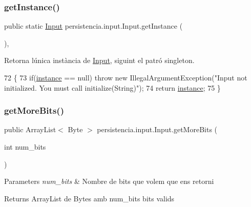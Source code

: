 \subsubsection{\texorpdfstring{get\+Instance()}{getInstance()}}
{\footnotesize\ttfamily public static \hyperlink{classpersistencia_1_1input_1_1Input}{Input} persistencia.\+input.\+Input.\+get\+Instance (\begin{DoxyParamCaption}{ }\end{DoxyParamCaption})\hspace{0.3cm}{\ttfamily [inline]}, {\ttfamily [static]}}



Retorna l\textquotesingle{}única instància de \hyperlink{classpersistencia_1_1input_1_1Input}{Input}, siguint el patró singleton. 


\begin{DoxyCode}
72                                       \{
73         \textcolor{keywordflow}{if}(\hyperlink{classpersistencia_1_1input_1_1Input_a2e516b1cbef9b704c10fd932b3d11afd}{instance} == null) \textcolor{keywordflow}{throw} \textcolor{keyword}{new} IllegalArgumentException(\textcolor{stringliteral}{"Input not initialized. You must
       call initialize(String)"});
74         \textcolor{keywordflow}{return} \hyperlink{classpersistencia_1_1input_1_1Input_a2e516b1cbef9b704c10fd932b3d11afd}{instance};
75     \}
\end{DoxyCode}
\mbox{\label{classpersistencia_1_1input_1_1Input_a81e96a5ac3ca41b5001ffff9f9acc76a}} 
\subsubsection{\texorpdfstring{get\+More\+Bits()}{getMoreBits()}}
{\footnotesize\ttfamily public Array\+List$<$ Byte $>$ persistencia.\+input.\+Input.\+get\+More\+Bits (\begin{DoxyParamCaption}\item[{int}]{num\+\_\+bits }\end{DoxyParamCaption})\hspace{0.3cm}{\ttfamily [inline]}}


\begin{DoxyParams}{Parameters}
{\em num\+\_\+bits} & Nombre de bits que volem que ens retorni \\
\hline
\end{DoxyParams}
\begin{DoxyReturn}{Returns}
Array\+List de Bytes amb num\+\_\+bits bits valids 
\end{DoxyReturn}

